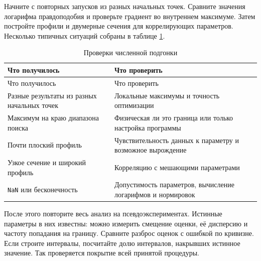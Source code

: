 \documentclass[
  russian,
  11pt,
  a4paper,
  open=any]{scrbook}
\begin{document}
Начните с повторных запусков из разных начальных точек. Сравните
значения логарифма правдоподобия и проверьте градиент во внутреннем
максимуме. Затем постройте профили и двумерные сечения для коррелирующих
параметров. Несколько типичных ситуаций собраны в таблице
\ref{tbl-likelihood-fit-problems}.

\begin{longtable}[]{@{}
  >{\raggedright\arraybackslash}p{}
  >{\raggedright\arraybackslash}p{}@{}}
\caption{Проверки численной
подгонки}\label{tbl-likelihood-fit-problems}\tabularnewline
\toprule\noalign{}
\begin{minipage}[b]{\linewidth}\raggedright
Что получилось
\end{minipage} & \begin{minipage}[b]{\linewidth}\raggedright
Что проверить
\end{minipage} \\
\midrule\noalign{}
\endfirsthead
\toprule\noalign{}
\begin{minipage}[b]{\linewidth}\raggedright
Что получилось
\end{minipage} & \begin{minipage}[b]{\linewidth}\raggedright
Что проверить
\end{minipage} \\
\midrule\noalign{}
\endhead
\bottomrule\noalign{}
\endlastfoot
Разные результаты из разных начальных точек & Локальные максимумы и
точность оптимизации \\
Максимум на краю диапазона поиска & Физическая ли это граница или только
настройка программы \\
Почти плоский профиль & Чувствительность данных к параметру и возможное
вырождение \\
Узкое сечение и широкий профиль & Корреляцию с мешающими параметрами \\
\texttt{NaN} или бесконечность & Допустимость параметров, вычисление
логарифмов и нормировок \\
\end{longtable}

После этого повторите весь анализ на псевдоэкспериментах. Истинные
параметры в них известны: можно измерить смещение оценки, её дисперсию и
частоту попадания на границу. Сравните разброс оценок с ошибкой по
кривизне. Если строите интервалы, посчитайте долю интервалов, накрывших
истинное значение. Так проверяется покрытие всей принятой процедуры.
\end{document}
